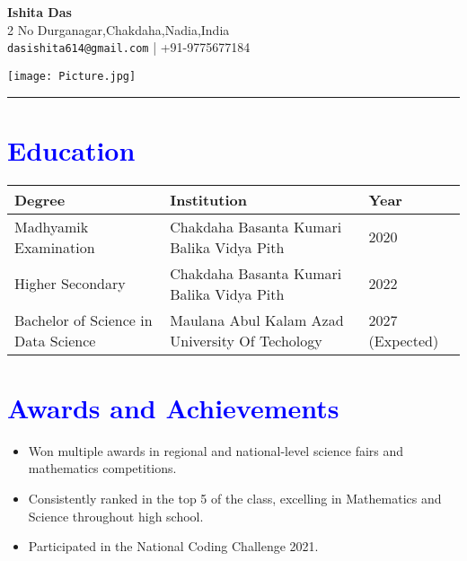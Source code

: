 \documentclass[a4paper,10pt]{article}
\begin{document}
\begin{minipage}{0.75\textwidth}
    \textbf{\huge Ishita Das}\\[5pt]
    2 No Durganagar,Chakdaha,Nadia,India\\
    \texttt{dasishita614@gmail.com} \hspace{5pt} | \hspace{3pt} +91-9775677184
\end{minipage}
\begin{minipage}{0.23\textwidth}
    \begin{flushright}
        \texttt{[image: Picture.jpg]}
    \end{flushright}
\end{minipage}

\vspace{10pt}
\hrule
\vspace{15pt}

\section*{\textcolor{blue}{Education}}
\begin{tabular}{ | m{5cm} | m{5cm} | m{4cm} | }
    \hline
    \textbf{Degree} & \textbf{Institution} & \textbf{Year} \\ 
    \hline
    Madhyamik Examination & Chakdaha Basanta Kumari Balika Vidya Pith & 2020 \\
    \hline
    Higher Secondary & Chakdaha Basanta Kumari Balika Vidya Pith & 2022 \\ 
    \hline
    Bachelor of Science in Data Science & Maulana Abul Kalam Azad University Of Techology & 2027 (Expected) \\ 
    \hline
\end{tabular}

\vspace{15pt}

\section*{\textcolor{blue}{Awards and Achievements}}
\begin{itemize}
    \item Won multiple awards in regional and national-level science fairs and mathematics competitions.
    \item Consistently ranked in the top 5  of the class, excelling in Mathematics and Science throughout high school.
    
    \item Participated  in the National Coding Challenge 2021.
\end{itemize}
\end{document}
